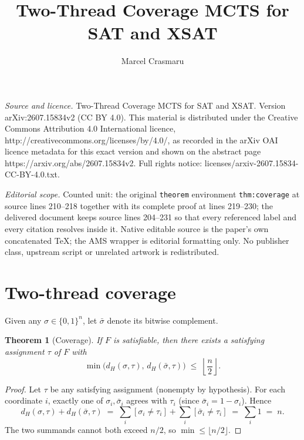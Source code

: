 \documentclass[10pt,a4paper]{amsart}
\newtheorem{theorem}{Theorem}
\begin{document}
\title[Two-Thread Coverage MCTS for SAT and XSAT]{Two-Thread Coverage MCTS for SAT and XSAT}
\author{Marcel Crasmaru}
\date{}
\maketitle
\noindent\emph{Source and licence.} Two-Thread Coverage MCTS for SAT and XSAT. Version arXiv:2607.15834v2 (CC BY 4.0). This material is distributed under the Creative Commons Attribution 4.0 International licence, http://creativecommons.org/licenses/by/4.0/, as recorded in the arXiv OAI licence metadata for this exact version and shown on the abstract page https://arxiv.org/abs/2607.15834v2. Full rights notice: licenses/arxiv-2607.15834-CC-BY-4.0.txt.\par\smallskip
\noindent\textit{Editorial scope.} Counted unit: the original \texttt{theorem} environment \texttt{thm:coverage} at source lines 210--218 together with its complete proof at lines 219--230; the delivered document keeps source lines 204--231 so that every referenced label and every citation resolves inside it. Native editable source is the paper's own concatenated TeX; the AMS wrapper is editorial formatting only. No publisher class, upstream script or unrelated artwork is redistributed.
\section{Two-thread coverage}
\label{sec:coverage}

Given any $\sigma \in \{0,1\}^n$, let $\bar\sigma$ denote its bitwise
complement.


\begin{theorem}[Coverage]
\label{thm:coverage}
If $F$ is satisfiable, then there exists a satisfying assignment
$\tau$ of $F$ with
\[
\min\bigl( d_H(\sigma, \tau),\, d_H(\bar\sigma, \tau) \bigr)
\;\le\; \left\lfloor \frac{n}{2} \right\rfloor.
\]
\end{theorem}

\begin{proof}
Let $\tau$ be any satisfying assignment (nonempty by hypothesis). For
each coordinate $i$, exactly one of $\sigma_i, \bar\sigma_i$ agrees
with $\tau_i$ (since $\bar\sigma_i = 1-\sigma_i$). Hence
\[
d_H(\sigma, \tau) + d_H(\bar\sigma, \tau)
   \;=\; \sum_i [\sigma_i \ne \tau_i] + \sum_i [\bar\sigma_i \ne \tau_i]
   \;=\; \sum_i 1 \;=\; n.
\]
The two summands cannot both exceed $n/2$, so
$\min \le \lfloor n/2 \rfloor$.
\end{proof}
\end{document}
